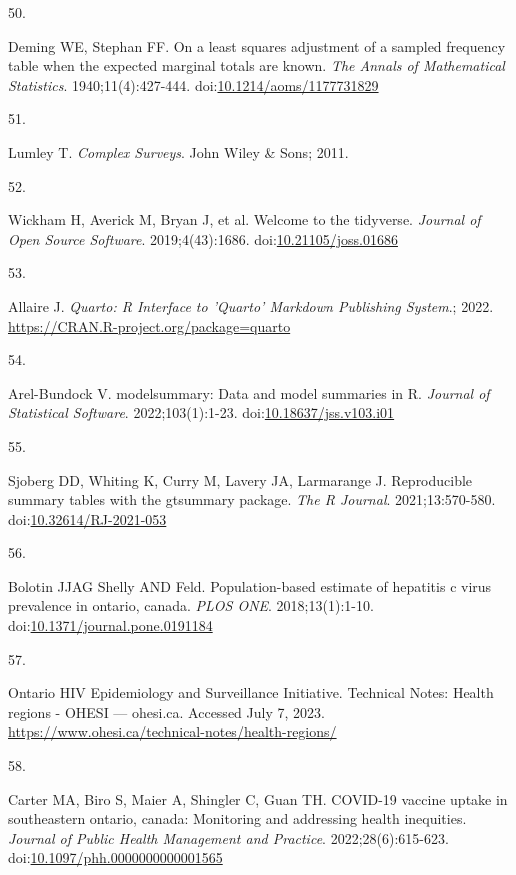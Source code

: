 \documentclass[
]{article}
\newlength{\cslhangindent}
\newlength{\csllabelwidth}
\newlength{\cslentryspacingunit} %
\newenvironment{CSLReferences}[2] %
 {%
  \setlength{\parindent}{0pt}
  \ifodd #1
  \let\oldpar\par
  \def\par{\hangindent=\cslhangindent\oldpar}
  \fi
  \setlength{\parskip}{#2\cslentryspacingunit}
 }%
 {}
\newcommand{\CSLLeftMargin}[1]{\parbox[t]{\csllabelwidth}{#1}}
\newcommand{\CSLRightInline}[1]{\parbox[t]{\linewidth - \csllabelwidth}{#1}\break}
\begin{document}
\begin{CSLReferences}{0}{0}
\leavevmode{}%
\CSLLeftMargin{50. }%
\CSLRightInline{Deming WE, Stephan FF. On a least squares adjustment of
a sampled frequency table when the expected marginal totals are known.
\emph{The Annals of Mathematical Statistics}. 1940;11(4):427-444.
doi:\href{https://doi.org/10.1214/aoms/1177731829}{10.1214/aoms/1177731829}}

\leavevmode{}%
\CSLLeftMargin{51. }%
\CSLRightInline{Lumley T. \emph{Complex Surveys}. John Wiley \& Sons;
2011.}

\leavevmode{}%
\CSLLeftMargin{52. }%
\CSLRightInline{Wickham H, Averick M, Bryan J, et al. Welcome to the
{tidyverse}. \emph{Journal of Open Source Software}. 2019;4(43):1686.
doi:\href{https://doi.org/10.21105/joss.01686}{10.21105/joss.01686}}

\leavevmode{}%
\CSLLeftMargin{53. }%
\CSLRightInline{Allaire J. \emph{Quarto: R Interface to 'Quarto'
Markdown Publishing System}.; 2022.
\url{https://CRAN.R-project.org/package=quarto}}

\leavevmode{}%
\CSLLeftMargin{54. }%
\CSLRightInline{Arel-Bundock V. {modelsummary}: Data and model summaries
in {R}. \emph{Journal of Statistical Software}. 2022;103(1):1-23.
doi:\href{https://doi.org/10.18637/jss.v103.i01}{10.18637/jss.v103.i01}}

\leavevmode{}%
\CSLLeftMargin{55. }%
\CSLRightInline{Sjoberg DD, Whiting K, Curry M, Lavery JA, Larmarange J.
Reproducible summary tables with the gtsummary package. \emph{{The R
Journal}}. 2021;13:570-580.
doi:\href{https://doi.org/10.32614/RJ-2021-053}{10.32614/RJ-2021-053}}

\leavevmode{}%
\CSLLeftMargin{56. }%
\CSLRightInline{Bolotin JJAG Shelly AND Feld. Population-based estimate
of hepatitis c virus prevalence in ontario, canada. \emph{PLOS ONE}.
2018;13(1):1-10.
doi:\href{https://doi.org/10.1371/journal.pone.0191184}{10.1371/journal.pone.0191184}}

\leavevmode{}%
\CSLLeftMargin{57. }%
\CSLRightInline{Ontario HIV Epidemiology and Surveillance Initiative.
{T}echnical {N}otes: {H}ealth regions - {O}{H}{E}{S}{I} --- ohesi.ca.
Accessed July 7, 2023.
\url{https://www.ohesi.ca/technical-notes/health-regions/}}

\leavevmode{}%
\CSLLeftMargin{58. }%
\CSLRightInline{Carter MA, Biro S, Maier A, Shingler C, Guan TH.
{COVID}-19 vaccine uptake in southeastern ontario, canada: Monitoring
and addressing health inequities. \emph{Journal of Public Health
Management and Practice}. 2022;28(6):615-623.
doi:\href{https://doi.org/10.1097/phh.0000000000001565}{10.1097/phh.0000000000001565}}


\end{CSLReferences}
\end{document}
